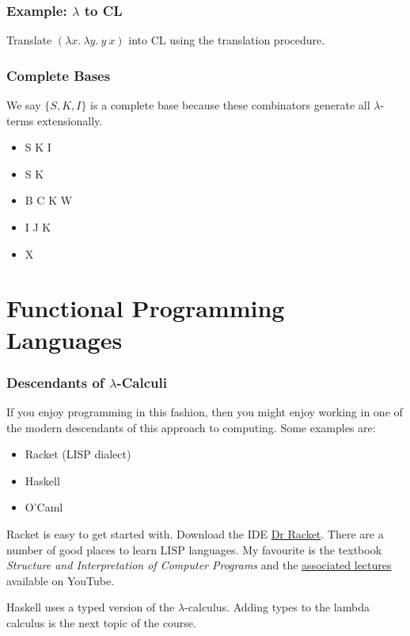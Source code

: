 \documentclass{beamer}
\begin{document}
\begin{frame}
	\frametitle{Example: $\lambda$ to CL}
	
	Translate $(\lambda x. \ \lambda y. \ y \ x)$ into CL using the translation procedure.
	
	\vspace{70mm}

\end{frame}

\begin{frame}
	\frametitle{Complete Bases}

	We say $\{S,K,I\}$ is a complete base because these combinators generate all $\lambda$-terms extensionally. 

	\begin{itemize}
		\item[] S K I 
		\item[] S K
		\item[] B C K W
		\item[] I J K
		\item[] X %
	\end{itemize}


\end{frame}

\section{Functional Programming Languages}

\begin{frame}
	\frametitle{Descendants of $\lambda$-Calculi}

	If you enjoy programming in this fashion, then you might enjoy working in one of the modern descendants of this approach to computing. Some examples are: 

	\begin{itemize}
		\item Racket (LISP dialect) %
		\item Haskell %
		\item O'Caml %
	\end{itemize}

	Racket is easy to get started with. Download the IDE \href{https://racket-lang.org/download/}{Dr Racket}. There are a number of good places to learn LISP languages. My favourite is the textbook \emph{Structure and Interpretation of Computer Programs} and the \href{https://www.youtube.com/playlist?list=PLE18841CABEA24090}{associated lectures} available on YouTube. 

	Haskell uses a typed version of the $\lambda$-calculus. Adding types to the lambda calculus is the next topic of the course. 

\end{frame}
\end{document}
